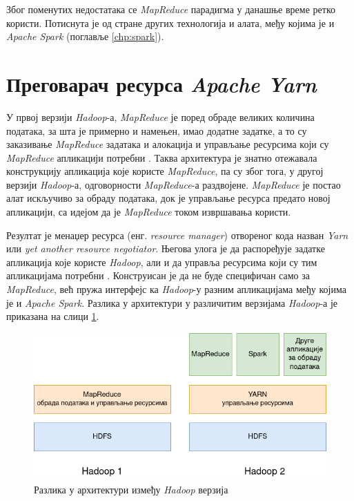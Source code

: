 \documentclass[12pt,oneside]{memoir}
\begin{document}
Због поменутих недостатака се \textit{MapReduce} парадигма у данашње време ретко користи. Потиснута је од стране других технологија и алата, међу којима је и \textit{Apache Spark}  (поглавље \ref{chp:spark}).

\section{Преговарач ресурса \textit{Apache Yarn}}
\label{sec:yarn}

У првој верзији \textit{Hadoop}-а, \textit{MapReduce} је поред обраде великих количина података, за шта је примерно и намењен, имао додатне задатке, а то су заказивање \textit{MapReduce} задатака и алокација и управљање ресурсима који су \textit{MapReduce} апликацији потребни \cite{hadoop_learning}. Таква архитектура је знатно отежавала конструкцију апликација које користе \textit{MapReduce}, па су због тога, у другој верзији \textit{Hadoop}-а, одговорности \textit{MapReduce}-а раздвојене. \textit{MapReduce} је постао алат искључиво за обраду података, док је управљање ресурса предато новој апликацији, са идејом да је \textit{MapReduce} током извршавања користи.

Резултат је менаџер ресурса (енг. \textit{resource manager}) отвореног кода назван \textit{Yarn} \cite{yarn} или \textit{yet another resource negotiator}. Његова улога је да распоређује задатке апликација које користе \textit{Hadoop}, али и да управља ресурсима који су тим апликацијама потребни  \cite{hadoop_learning}. Конструисан је да не буде специфичан само за \textit{MapReduce}, већ пружа интерфејс ка \textit{Hadoop}-у разним апликацијама међу којима је и \textit{Apache Spark}. Разлика у архитектури у различитим верзијама \textit{Hadoop}-а је приказана на слици \ref{fig:yarn_hadoop_versions}.

\begin{figure}[!ht]
  \centering
  \includegraphics[width=1\textwidth]{pictures/mr_yarn_hadoop_versions.png}
  \caption{Разлика у архитектури између \textit{Hadoop} верзија}
  \label{fig:yarn_hadoop_versions}
\end{figure}
\end{document}

